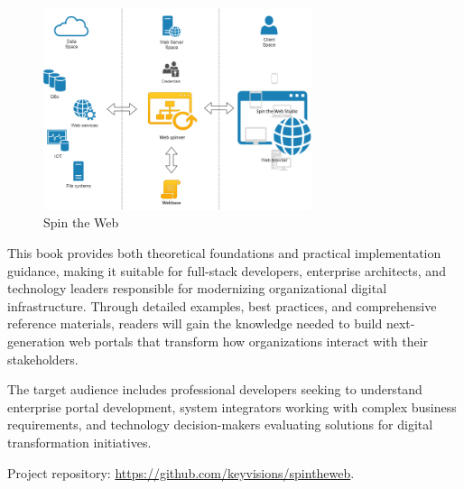 \begin{figure}[h]
\centering
\includegraphics[width=0.7\textwidth]{figures/spin-the-web.png}
\caption{Spin the Web}
\label{fig:spin-the-web}
\end{figure}

This book provides both theoretical foundations and practical implementation guidance, making it suitable for full-stack developers, enterprise architects, and technology leaders responsible for modernizing organizational digital infrastructure. Through detailed examples, best practices, and comprehensive reference materials, readers will gain the knowledge needed to build next-generation web portals that transform how organizations interact with their stakeholders.

The target audience includes professional developers seeking to understand enterprise portal development, system integrators working with complex business requirements, and technology decision-makers evaluating solutions for digital transformation initiatives.

Project repository: \url{https://github.com/keyvisions/spintheweb}.

\clearpage
